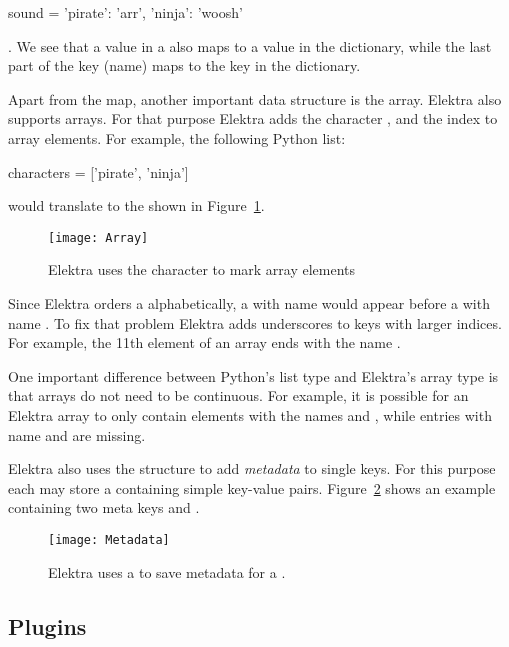 \begin{pythoncode}
  sound = {'pirate': 'arr', 'ninja': 'woosh'}
\end{pythoncode}

. We see that a value in a  also maps to a value in the dictionary, while the last part of the key (name) maps to the key in the dictionary.

Apart from the map, another important data structure is the array. Elektra also supports arrays. For that purpose Elektra adds the character \code{\#}, and the index to array elements. For example, the following Python list:

\begin{pythoncode}
  characters = ['pirate', 'ninja']
\end{pythoncode}

would translate to the  shown in Figure~\ref{fig:array}.

\begin{figure}
  \centering
    \texttt{[image: Array]}
  \caption{Elektra uses the character \code{\#} to mark array elements}
  \label{fig:array}
\end{figure}

Since Elektra orders a  alphabetically, a  with name  would appear before a  with name . To fix that problem Elektra adds underscores to keys with larger indices. For example, the 11th element of an array ends with the name .

One important difference between Python’s list type and Elektra’s array type is that arrays do not need to be continuous. For example, it is possible for an Elektra array to only contain elements with the names  and , while  entries with name  and  are missing.

Elektra also uses the  structure to add \emph{metadata} to single keys. For this purpose each  may store a  containing simple key-value pairs. Figure~\ref{fig:metadata} shows an example  containing two meta keys  and .

\begin{figure}
  \centering
    \texttt{[image: Metadata]}
  \caption{Elektra uses a  to save metadata for a .}
  \label{fig:metadata}
\end{figure}

\FloatBarrier
\subsection{Plugins}
\label{sec:plugins}

